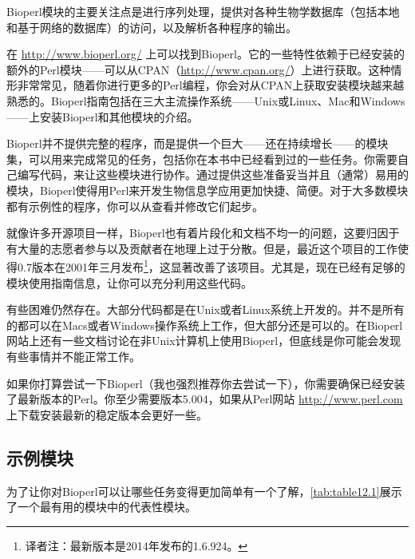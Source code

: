 Bioperl模块的主要关注点是进行序列处理，提供对各种生物学数据库（包括本地和基于网络的数据库）的访问，以及解析各种程序的输出。

在 \href{http://www.bioperl.org/}{http://www.bioperl.org/} 上可以找到Bioperl。它的一些特性依赖于已经安装的额外的Perl模块——可以从CPAN（\href{http://www.cpan.org/}{http://www.cpan.org/}）上进行获取。这种情形非常常见，随着你进行更多的Perl编程，你会对从CPAN上获取安装模块越来越熟悉的。Bioperl指南包括在三大主流操作系统——Unix或Linux、Mac和Windows——上安装Bioperl和其他模块的介绍。

Bioperl并不提供完整的程序，而是提供一个巨大——还在持续增长——的模块集，可以用来完成常见的任务，包括你在本书中已经看到过的一些任务。你需要自己编写代码，来让这些模块进行协作。通过提供这些准备妥当并且（通常）易用的模块，Bioperl使得用Perl来开发生物信息学应用更加快捷、简便。对于大多数模块都有示例性的程序，你可以从查看并修改它们起步。

就像许多开源项目一样，Bioperl也有着片段化和文档不均一的问题，这要归因于有大量的志愿者参与以及贡献者在地理上过于分散。但是，最近这个项目的工作使得0.7版本在2001年三月发布\footnote{译者注：最新版本是2014年发布的1.6.924。}，这显著改善了该项目。尤其是，现在已经有足够的模块使用指南信息，让你可以充分利用这些代码。

有些困难仍然存在。大部分代码都是在Unix或者Linux系统上开发的。并不是所有的都可以在Macs或者Windows操作系统上工作，但大部分还是可以的。在Bioperl网站上还有一些文档讨论在非Unix计算机上使用Bioperl，但底线是你可能会发现有些事情并不能正常工作。

如果你打算尝试一下Bioperl（我也强烈推荐你去尝试一下），你需要确保已经安装了最新版本的Perl。你至少需要版本5.004，如果从Perl网站 \href{http://www.perl.com}{http://www.perl.com} 上下载安装最新的稳定版本会更好一些。

\subsection{示例模块}
为了让你对Bioperl可以让哪些任务变得更加简单有一个了解，\autoref{tab:table12.1}展示了一个最有用的模块中的代表性模块。

